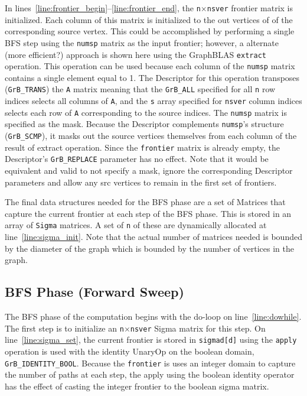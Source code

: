 In lines~\ref{line:frontier_begin}--\ref{line:frontier_end}, the 
{\tt n}$\times${\tt nsver} frontier matrix is initialized.  Each column of this 
matrix is initialized to the out vertices of of the corresponding source
vertex.  This could be accomplished by performing a single BFS step using the 
{\tt numsp} matrix as the input frontier; however, a alternate (more efficient?)
approach is shown here using the GraphBLAS {\tt extract}
operation.  This operation can be used because each
column of the {\tt numsp} matrix contains a single element equal to 1. 
The Descriptor for this operation transposes ({\tt GrB\_TRANS}) the {\tt A} 
matrix meaning that the {\tt GrB\_ALL} specified for all {\tt n} row indices 
selects all columns of {\tt A}, and the {\tt s} array specified for {\tt nsver} 
column indices selects
each row of {\tt A} corresponding to the source indices. The {\tt numsp} matrix
is specified as the mask. Because the Descriptor complements {\tt numsp}'s 
structure ({\tt GrB\_SCMP}), it masks out the source vertices themselves from 
each column of the result
of extract operation.  Since the {\tt frontier} matrix is already empty, the 
Descriptor's {\tt GrB\_REPLACE} parameter has no effect.
Note that it would be equivalent and valid to not specify a mask, ignore the
corresponding Descriptor parameters and allow any src vertices to remain in the
first set of frontiers.  

The final data structures needed for the BFS phase are a set of Matrices that
capture the current frontier at each step of the BFS phase.  This is stored in
an array of {\tt Sigma} matrices.  A set of {\tt n} of these are dynamically
allocated at line~\ref{line:sigma_init}.  Note that the actual number of matrices 
needed is bounded by the diameter of the graph which is bounded by the number of 
vertices in the graph.

\subsection{BFS Phase (Forward Sweep)}

The BFS phase of the computation begins with the do-loop on line~\ref{line:dowhile}. 
The first step is to initialize an {\tt n}$\times${\tt nsver} Sigma matrix for 
this step.  On line~\ref{line:sigma_set}, the current frontier is stored in 
{\tt sigmad[d]} using the {\tt apply} operation is used with the identity UnaryOp on
the boolean domain, {\tt GrB\_IDENTITY\_BOOL}.  Because the {\tt frontier} is uses
an integer domain to capture the number of paths at each step, the apply using the
boolean identity operator has the effect of casting the integer frontier to the boolean
sigma matrix.

